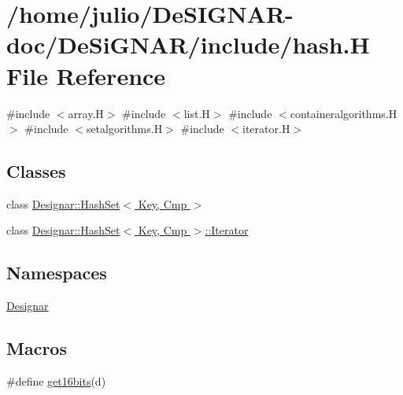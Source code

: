 \hypertarget{hash_8_h}{}\section{/home/julio/\+De\+S\+I\+G\+N\+A\+R-\/doc/\+De\+Si\+G\+N\+A\+R/include/hash.H File Reference}
\label{hash_8_h}
{\ttfamily \#include $<$array.\+H$>$}\newline
{\ttfamily \#include $<$list.\+H$>$}\newline
{\ttfamily \#include $<$containeralgorithms.\+H$>$}\newline
{\ttfamily \#include $<$setalgorithms.\+H$>$}\newline
{\ttfamily \#include $<$iterator.\+H$>$}\newline
\subsection*{Classes}
\begin{DoxyCompactItemize}
\item 
class \hyperlink{class_designar_1_1_hash_set}{Designar\+::\+Hash\+Set$<$ Key, Cmp $>$}
\item 
class \hyperlink{class_designar_1_1_hash_set_1_1_iterator}{Designar\+::\+Hash\+Set$<$ Key, Cmp $>$\+::\+Iterator}
\end{DoxyCompactItemize}
\subsection*{Namespaces}
\begin{DoxyCompactItemize}
\item 
 \hyperlink{namespace_designar}{Designar}
\end{DoxyCompactItemize}
\subsection*{Macros}
\begin{DoxyCompactItemize}
\item 
\#define \hyperlink{hash_8_h_abc7d71657be8975a51684e41029b7964}{get16bits}(d)
\end{DoxyCompactItemize}
